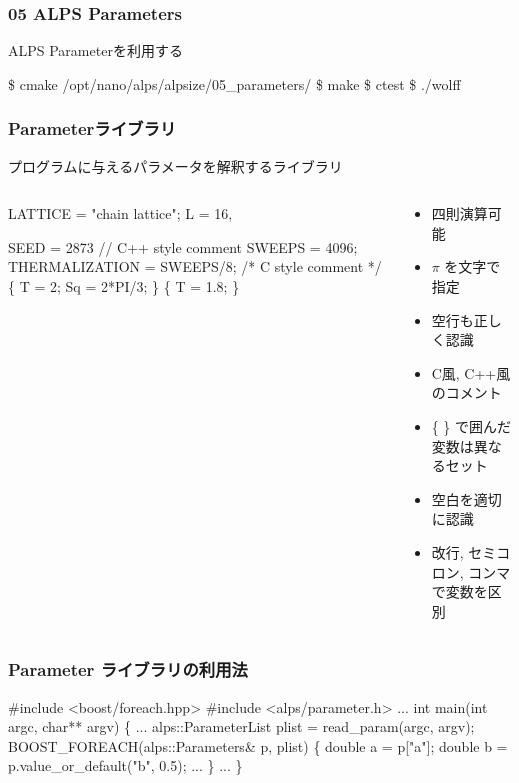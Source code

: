 \begin{frame}[fragile]
  \frametitle{05 ALPS Parameters}
  ALPS Parameterを利用する
\begin{semiverbatim}
\$ cmake /opt/nano/alps/alpsize/05_parameters/
\$ make
\$ ctest
\$ ./wolff
\end{semiverbatim}
\end{frame}

\begin{frame}[fragile] \frametitle{Parameterライブラリ}
  プログラムに与えるパラメータを解釈するライブラリ
  \begin{columns}
    \begin{column}{6cm}
\begin{semiverbatim}
LATTICE = "chain lattice";
L = 16,

SEED = 2873
// C++ style comment
SWEEPS = 4096;
THERMALIZATION = \alert<1>{SWEEPS/8};
/* C style comment */
\{ T = 2; Sq = 2*\alert<2>{PI}/3; \}
\{ T = 1.8; \}
\end{semiverbatim}
    \end{column}
    \begin{column}{6cm}
      \begin{itemize}
      \item 四則演算可能
      \item $\pi$ を文字で指定
      \item 空行も正しく認識
      \item C風, C++風のコメント
      \item \{ \} で囲んだ変数は異なるセット
      \item 空白を適切に認識
      \item 改行, セミコロン, コンマで変数を区別
      \end{itemize}
    \end{column}
  \end{columns}
\end{frame}

\begin{frame}[fragile,shrink=5] \frametitle{Parameter ライブラリの利用法}
\begin{semiverbatim}
#include <boost/foreach.hpp>
#include <alps/parameter.h>
...
int main(int argc, char** argv) \{
...
  alps::ParameterList plist = read_param(argc, argv);
  BOOST_FOREACH(alps::Parameters& p, plist) \{
    \alert<1>{double a = p["a"];}
    \alert<2>{double b = p.value_or_default("b", 0.5);}
...
  \}
...
\}
\end{semiverbatim}
\end{frame}

